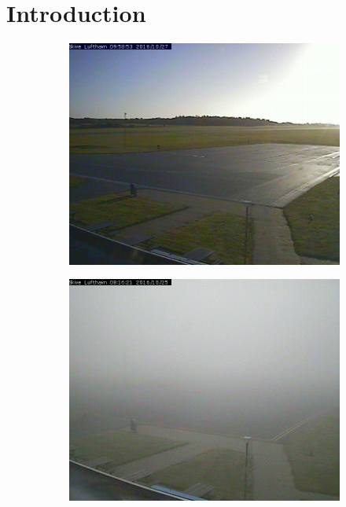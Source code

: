 \documentclass[
    ,title     = {{Methods for image classification}}
    ,longtitle
    ,highlight = dtured
    ,toplogo   = {{template/tex_dtu_compute_b_uk}}
    ,botlogo   = {{template/tex_dtu_frise}}
    ,papersize = {{a0paper}}
    ,colcount  = {{3columns}}
]{dtuposter}
\begin{document}
\begin{dtuposterhead} %
\end{dtuposterhead}
%
%
\begin{minipage}{\textwidth}
\section*{Introduction}

\begin{figure}
\centering
\vspace{-12cm}
\begin{subfigure}[t]{0.15\textwidth}
\includegraphics[width=\textwidth]{Figures/clear_example}
\end{subfigure}
\begin{subfigure}[t]{0.15\textwidth}
\includegraphics[width=\textwidth]{Figures/foggy_example}

\end{subfigure}
\end{figure}
\end{minipage}
\end{document}
